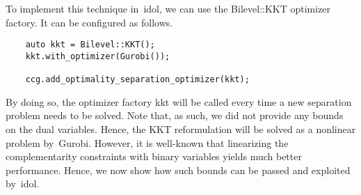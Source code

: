 To implement this technique in~\textsf{idol}, we can use the
\textsf{Bilevel::KKT} optimizer factory. It can be configured as follows. 
%
\begin{lstlisting}
    auto kkt = Bilevel::KKT();
    kkt.with_optimizer(Gurobi());

    ccg.add_optimality_separation_optimizer(kkt);
\end{lstlisting}

By doing so, the optimizer factory \textsf{kkt} will be called every time a
new separation problem needs to be solved. Note that, as such, we did not
provide any bounds on the dual variables. Hence, the KKT reformulation will be
solved as a nonlinear problem by~\textsf{Gurobi}. However, it is well-known
that linearizing the complementarity constraints with binary variables yields
much better performance. Hence, we now show how such bounds can be passed and
exploited by~\textsf{idol}.

